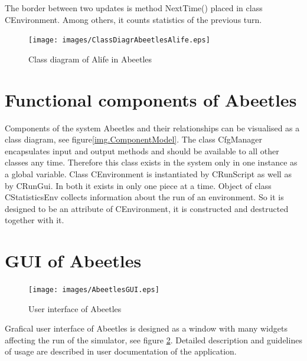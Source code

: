 \documentclass[a4paper,12pt]{report}
\begin{document}
The border between two updates is method NextTime() placed in class CEnvironment. Among others, it counts statistics of the previous turn.

\begin{figure}
\begin{center}
  \texttt{[image: images/ClassDiagrAbeetlesAlife.eps]}
  \caption{Class diagram of Alife in Abeetles}
  \label{img.ClassDiagrAbeetlesAlife}
\end{center}
\end{figure}


\section{Functional components of Abeetles}
Components of the system Abeetles and their relationships can be visualised as a class diagram, see figure\ref{img.ComponentModel}. The class CfgManager encapsulates input and output methods and should be available to all other classes any time. Therefore this class exists in the system only in one instance as a global variable. Class CEnvironment is instantiated by CRunScript as well as by CRunGui. In both it exists in only one piece at a time. Object of class CStatisticsEnv collects information about the run of an environment. So it is designed to be an attribute of CEnvironment, it is constructed and destructed together with it.


\section {GUI of Abeetles}
\begin{figure}
\begin{center}
  \texttt{[image: images/AbeetlesGUI.eps]}
  \caption{User interface of Abeetles}
  \label{img.AbeetlesGUI}
\end{center}
\end{figure}

Grafical user interface of Abeetles is designed as a window with many widgets affecting the run of the simulator, see figure \ref{img.AbeetlesGUI}. Detailed description and guidelines of usage are described in user documentation of the application.
\end{document}
